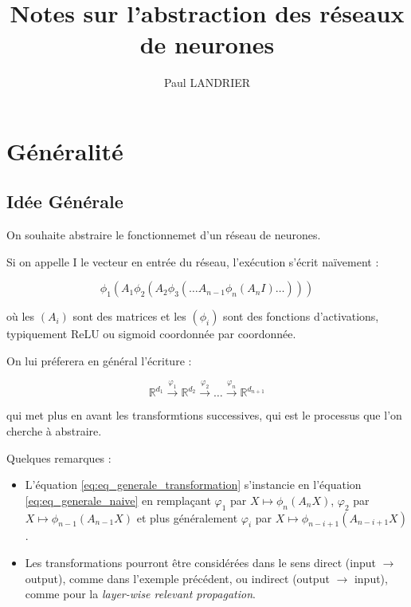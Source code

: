 \documentclass[11pt,a4paper]{article}
\title{Notes sur l'abstraction des réseaux de neurones}
\author{Paul LANDRIER}
\date{}
\newcommand{\R}{\ensuremath{\mathbb{R}}}
\begin{document}
\maketitle

\section{Généralité}

\subsection{Idée Générale}

On souhaite abstraire le fonctionnemet d'un réseau de neurones.

Si on appelle I le vecteur en entrée du réseau, l'exécution s'écrit naïvement :

\begin{equation}
\label{eq:eq_generale_naive}
\phi_1 ( A_1 \phi_2 (A_2 \phi_3( \dots A_{n-1} \phi_n (A_n I) \dots )))
\end{equation}

où les $(A_i)$ sont des matrices et les $(\phi_i)$ sont des fonctions d'activations, typiquement ReLU ou sigmoid coordonnée par coordonnée.

 On lui préferera en général l'écriture : 
 
\begin{equation}
\label{eq:eq_generale_transformation}
\R^{d_1} \overset{\varphi_1}{\to} \R^{d_2} \overset{\varphi_2}{\to} \dots \overset{\varphi_n}{\to} \R^{d_{n+1}}
\end{equation}

qui met plus en avant les transformtions successives, qui est le processus que l'on cherche à abstraire.

Quelques remarques :
\begin{itemize}

	\item L'équation \ref{eq:eq_generale_transformation} s'instancie en l'équation \ref{eq:eq_generale_naive} en remplaçant $\varphi_1$ par $X \mapsto \phi_n(A_n X)$, $\varphi_2$ par $X \mapsto \phi_{n-1}(A_{n-1} X)$ et plus généralement $\varphi_i$ par $X \mapsto \phi_{n-i+1}(A_{n-i+1} X)$.
	
	\item Les transformations pourront être considérées dans le sens direct (input $\to$ output), comme dans l'exemple précédent, ou indirect (output $\to$ input), comme pour la \textit{layer-wise relevant propagation}.
	
\end{itemize}
\end{document}
